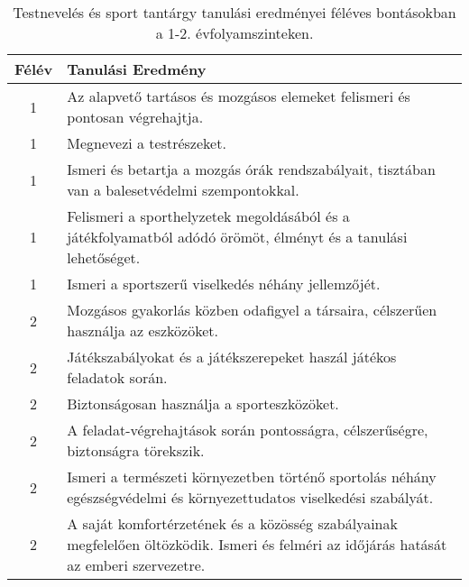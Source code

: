        
           \begin{longtable}{c | p{12cm} }
            \caption[Testnevelés és sport 1-2.]{Testnevelés és sport tantárgy tanulási eredményei féléves bontásokban a 1-2. évfolyamszinteken. }  \\

            \textbf{Félév} & \textbf{Tanulási Eredmény} \\
            \hline
            \endhead
                                
                                          1 &  Az alapvető tartásos és mozgásos elemeket felismeri és pontosan végrehajtja. \\ \hline
                                          1 &  Megnevezi a testrészeket. \\ \hline
                                          1 &  Ismeri és betartja a mozgás órák rendszabályait, tisztában van a balesetvédelmi szempontokkal. \\ \hline
                                          1 &  Felismeri a sporthelyzetek megoldásából és a játékfolyamatból adódó örömöt, élményt és a tanulási lehetőséget. \\ \hline
                                          1 &  Ismeri a sportszerű viselkedés néhány jellemzőjét. \\ \hline
                                      
                                
                                          2 &  Mozgásos gyakorlás közben odafigyel a társaira, célszerűen használja az eszközöket. \\ \hline
                                          2 &  Játékszabályokat és a játékszerepeket haszál játékos feladatok során. \\ \hline
                                          2 &  Biztonságosan használja a sporteszközöket. \\ \hline
                                          2 &  A feladat-végrehajtások során pontosságra, célszerűségre, biztonságra törekszik. \\ \hline
                                          2 &  Ismeri a természeti környezetben történő sportolás néhány egészségvédelmi és környezettudatos viselkedési szabályát. \\ \hline
                                          2 &  A saját komfortérzetének és a közösség szabályainak megfelelően öltözködik. Ismeri és felméri az időjárás hatását az emberi szervezetre. \\ \hline
                                      

\end{longtable}
